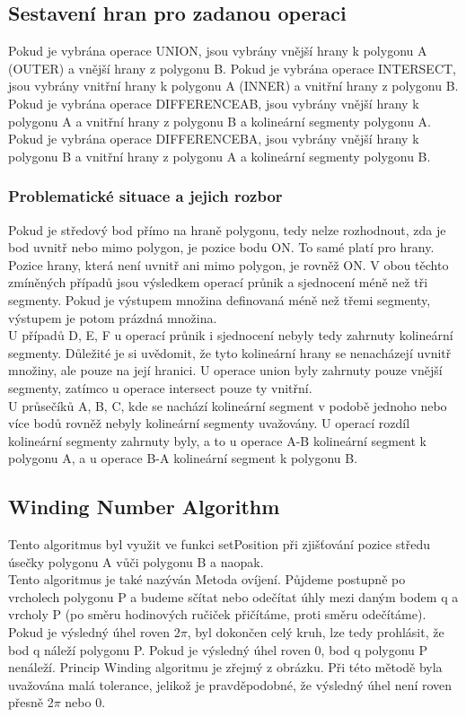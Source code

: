 \documentclass[a4paper,11pt,twoside]{article}
\begin{document}
\newpage
\vspace*{-1cm}
\subsection{Sestavení hran pro zadanou operaci}
Pokud je vybrána operace UNION, jsou vybrány vnější hrany k polygonu A (OUTER) a vnější hrany z polygonu B.
Pokud je vybrána operace INTERSECT, jsou vybrány vnitřní hrany k polygonu A (INNER) a vnitřní hrany z polygonu B.
Pokud je vybrána operace DIFFERENCEAB, jsou vybrány vnější hrany k polygonu A a vnitřní hrany z polygonu B a kolineární segmenty polygonu A.
Pokud je vybrána operace DIFFERENCEBA, jsou vybrány vnější hrany k polygonu B a vnitřní hrany z polygonu A a kolineární segmenty polygonu B.

\subsubsection{Problematické situace a jejich rozbor}
Pokud je středový bod přímo na hraně polygonu, tedy nelze rozhodnout, zda je bod uvnitř nebo mimo polygon, je pozice bodu ON. To samé platí pro hrany. Pozice hrany, která není uvnitř ani mimo polygon, je rovněž ON. V obou těchto zmíněných případů jsou výsledkem operací průnik a sjednocení méně než tři segmenty. Pokud je výstupem množina definovaná méně než třemi segmenty, výstupem je potom prázdná množina. \\
\indent U případů D, E, F u operací průnik i sjednocení nebyly tedy zahrnuty kolineární segmenty. Důležité je si uvědomit, že tyto kolineární hrany se nenacházejí uvnitř množiny, ale pouze na její hranici. U operace union byly zahrnuty pouze vnější segmenty, zatímco u operace intersect pouze ty vnitřní. \\
\indent U průsečíků A, B, C, kde se nachází kolineární segment v podobě jednoho nebo více bodů rovněž nebyly kolineární segmenty uvažovány. U operací rozdíl kolineární segmenty zahrnuty byly, a to u operace A-B kolineární segment k polygonu A, a u operace B-A kolineární segment k polygonu B. 

\newpage
\vspace*{-1cm}
\subsection{Winding Number Algorithm}
\large
\noindent Tento algoritmus byl využit ve funkci setPosition při zjišťování pozice středu úsečky polygonu A vůči polygonu B a naopak.
\\
\noindent Tento algoritmus je také nazýván Metoda ovíjení. Půjdeme postupně po vrcholech polygonu P a budeme sčítat nebo odečítat úhly mezi daným bodem q a vrcholy P (po směru hodinových ručiček přičítáme, proti směru odečítáme). Pokud je výsledný úhel roven 2$\pi$, byl dokončen celý kruh, lze tedy prohlásit, že bod q náleží polygonu P. Pokud je výsledný úhel roven 0, bod q polygonu P nenáleží. Princip Winding algoritmu je zřejmý z obrázku. Při této mětodě byla uvažována malá tolerance, jelikož je pravděpodobné, že výsledný úhel není roven přesně 2$\pi$ nebo 0.
\end{document}
